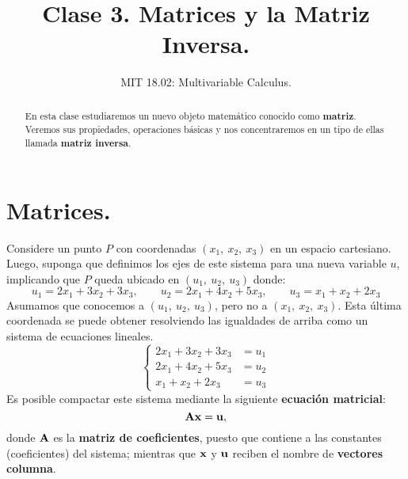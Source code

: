 \documentclass[12pt]{article}
\title{Clase 3. Matrices y la Matriz Inversa.}
\author{MIT 18.02: Multivariable Calculus.}
\date{}
\begin{document}


\maketitle

\begin{abstract}
\noindent En esta clase estudiaremos un nuevo objeto matemático conocido como \textbf{matriz}. Veremos sus propiedades, operaciones básicas y nos concentraremos en un tipo de ellas llamada \textbf{matriz inversa}.
\end{abstract}


\section{Matrices.}

Considere un punto $P$ con coordenadas $(x_{1}, \ x_{2}, \ x_{3})$ en un espacio cartesiano. Luego, suponga que definimos los ejes de este sistema para una nueva variable $u$, implicando que $P$ queda ubicado en $(u_{1}, \ u_{2}, \ u_{3})$ donde:
\[
  u_{1} = 2x_{1} + 3x_{2} + 3x_{3}, \qquad
  u_{2} = 2x_{1} + 4x_{2} + 5x_{3}, \qquad
  u_{3} =  x_{1} + x_{2} + 2x_{3}
\]
Asumamos que conocemos a $(u_{1}, \ u_{2}, \ u_{3})$, pero no a $(x_{1}, \ x_{2}, \ x_{3})$. Esta última coordenada se puede obtener resolviendo las igualdades de arriba como un sistema de ecuaciones lineales.
\[
\left\{
\begin{aligned}
2x_{1} + 3x_{2} + 3x_{3} &= u_{1} \\
2x_{1} + 4x_{2} + 5x_{3} &= u_{2} \\
  x_{1} + x_{2} + 2x_{3} &= u_{3}
\end{aligned}
\right.
\]
Es posible compactar este sistema mediante la siguiente \textbf{ecuación matricial}:
\[
  \mathbf{A} \mathbf{x} = \mathbf{u},
\]
donde $\mathbf{A}$ es la \textbf{matriz de coeficientes}, puesto que contiene a las constantes (coeficientes) del sistema; mientras que $\mathbf{x}$ y $\mathbf{u}$ reciben el nombre de \textbf{vectores columna}.

\newpage
\end{document}
